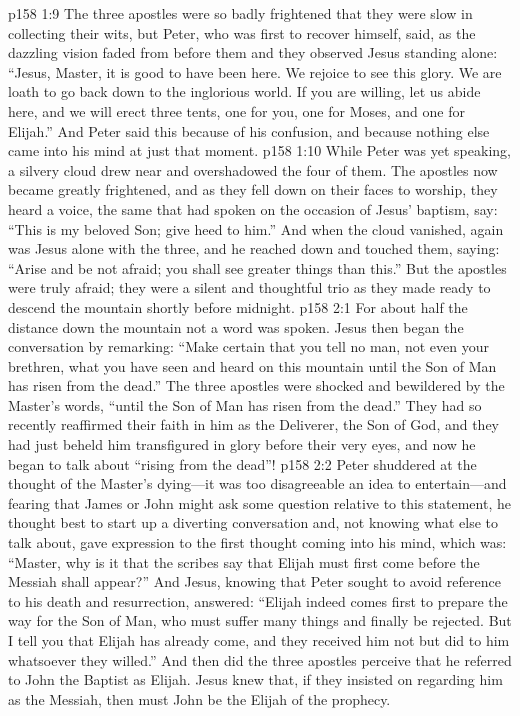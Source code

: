 \vs p158 1:9 The three apostles were so badly frightened that they were slow in collecting their wits, but Peter, who was first to recover himself, said, as the dazzling vision faded from before them and they observed Jesus standing alone: “Jesus, Master, it is good to have been here. We rejoice to see this glory. We are loath to go back down to the inglorious world. If you are willing, let us abide here, and we will erect three tents, one for you, one for Moses, and one for Elijah.” And Peter said this because of his confusion, and because nothing else came into his mind at just that moment.
\vs p158 1:10 While Peter was yet speaking, a silvery cloud drew near and overshadowed the four of them. The apostles now became greatly frightened, and as they fell down on their faces to worship, they heard a voice, the same that had spoken on the occasion of Jesus’ baptism, say: “This is my beloved Son; give heed to him.” And when the cloud vanished, again was Jesus alone with the three, and he reached down and touched them, saying: \textcolor{ubdarkred}{“Arise and be not afraid; you shall see greater things than this.”} But the apostles were truly afraid; they were a silent and thoughtful trio as they made ready to descend the mountain shortly before midnight.
\vs p158 2:1 For about half the distance down the mountain not a word was spoken. Jesus then began the conversation by remarking: \textcolor{ubdarkred}{“Make certain that you tell no man, not even your brethren, what you have seen and heard on this mountain until the Son of Man has risen from the dead.”} The three apostles were shocked and bewildered by the Master’s words, \textcolor{ubdarkred}{“until the Son of Man has risen from the dead.”} They had so recently reaffirmed their faith in him as the Deliverer, the Son of God, and they had just beheld him transfigured in glory before their very eyes, and now he began to talk about \textcolor{ubdarkred}{“rising from the dead”!}
\vs p158 2:2 Peter shuddered at the thought of the Master’s dying---it was too disagreeable an idea to entertain---and fearing that James or John might ask some question relative to this statement, he thought best to start up a diverting conversation and, not knowing what else to talk about, gave expression to the first thought coming into his mind, which was: “Master, why is it that the scribes say that Elijah must first come before the Messiah shall appear?” And Jesus, knowing that Peter sought to avoid reference to his death and resurrection, answered: \textcolor{ubdarkred}{“Elijah indeed comes first to prepare the way for the Son of Man, who must suffer many things and finally be rejected. But I tell you that Elijah has already come, and they received him not but did to him whatsoever they willed.”} And then did the three apostles perceive that he referred to John the Baptist as Elijah. Jesus knew that, if they insisted on regarding him as the Messiah, then must John be the Elijah of the prophecy.
